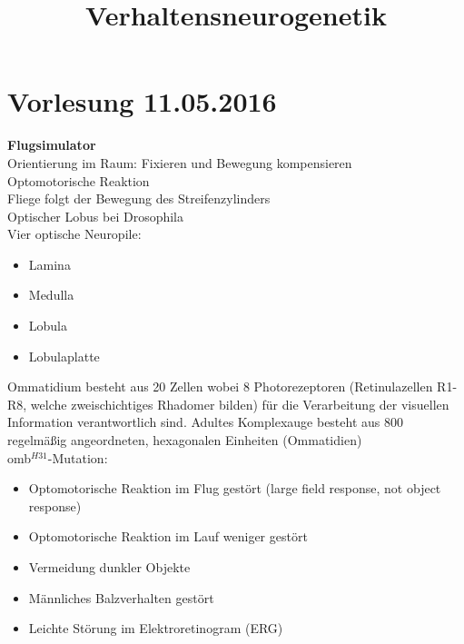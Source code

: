\documentclass[12pt,a4paper]{article}
\title{Verhaltensneurogenetik}
\author{}
\date{}
\begin{document}
\begin{titlepage}

\maketitle
\thispagestyle{empty}
\end{titlepage}
\newpage

\begin{titlepage}
\tableofcontents
\thispagestyle{empty}
\end{titlepage}
\newpage

\section{Vorlesung 11.05.2016}

\textbf{Flugsimulator}\\
Orientierung im Raum: Fixieren und Bewegung kompensieren\\
Optomotorische Reaktion\\
Fliege folgt der Bewegung des Streifenzylinders\\
Optischer Lobus bei Drosophila\\
Vier optische Neuropile:
\begin{itemize}
	\item Lamina
	\item Medulla
	\item Lobula
	\item Lobulaplatte
\end{itemize}

Ommatidium besteht aus 20 Zellen wobei 8 Photorezeptoren (Retinulazellen R1-R8, welche zweischichtiges Rhadomer bilden) für die Verarbeitung der visuellen Information verantwortlich sind. Adultes Komplexauge besteht aus 800 regelmäßig angeordneten, hexagonalen Einheiten (Ommatidien)\\

omb$^{H31}$-Mutation:
\begin{itemize}
	\item Optomotorische Reaktion im Flug gestört (large field response, not object response)
	\item Optomotorische Reaktion im Lauf weniger gestört
	\item Vermeidung dunkler Objekte
	\item Männliches Balzverhalten gestört
	\item Leichte Störung im Elektroretinogram (ERG)
\end{itemize}
\end{document}
